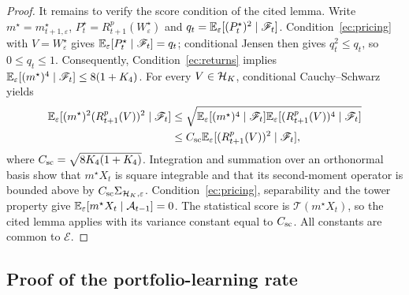\begin{proof}
It remains to verify the score condition of the cited lemma.
Write $m^\star=m^\star_{t+1,\varepsilon}$,
$P_t^\star=R^p_{t+1}(W^\star_\varepsilon)$ and
$q_t=\mathbb{E}_\varepsilon[(P_t^\star)^2\mid\mathscr F_t]$.
Condition~\ref{ec:pricing} with $V=W^\star_\varepsilon$ gives
$\mathbb{E}_\varepsilon[P_t^\star\mid\mathscr F_t]=q_t$; conditional Jensen
then gives $q_t^2\leq q_t$, so $0\leq q_t\leq1$.
Consequently, Condition~\ref{ec:returns} implies
$\mathbb{E}_\varepsilon[(m^\star)^4\mid\mathscr F_t]\leq8(1+K_4)$.
For every $V\in\mathcal{H}_K$, conditional Cauchy--Schwarz yields
\[
\begin{aligned}
\mathbb{E}_\varepsilon[(m^\star)^2(R^p_{t+1}(V))^2\mid\mathscr F_t]
&\leq
\sqrt{\mathbb{E}_\varepsilon[(m^\star)^4\mid\mathscr F_t]
\mathbb{E}_\varepsilon[(R^p_{t+1}(V))^4\mid\mathscr F_t]}\\
&\leq
C_{\rm sc}\mathbb{E}_\varepsilon[(R^p_{t+1}(V))^2\mid\mathscr F_t],
\end{aligned}
\]
where $C_{\rm sc}=\sqrt{8K_4(1+K_4)}$.
Integration and summation over an orthonormal basis show that
$m^\star X_t$ is square integrable and that its second-moment operator
is bounded above by $C_{\rm sc}\Sigma_{\mathcal{H}_K,\varepsilon}$.
Condition~\ref{ec:pricing}, separability and the tower property give
$\mathbb{E}_\varepsilon[m^\star X_t\mid\mathcal A_{t-1}]=0$.
The statistical score is $\mathcal T(m^\star X_t)$, so the cited lemma
applies with its variance constant equal to $C_{\rm sc}$.
All constants are common to $\mathcal E$.
\end{proof}

\subsection{Proof of the portfolio-learning rate}
\label{app:rate}

